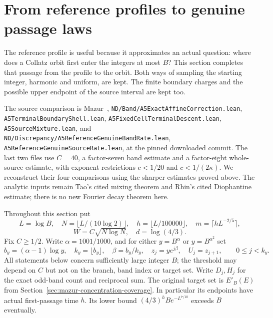 \documentclass[11pt]{article}
\theoremstyle{remark}\newtheorem{remark}[proposition]{Remark}
\begin{document}
\section{From reference profiles to genuine passage laws}
\label{sec:mazur-genuine-assembly}

The reference profile is useful because it approximates an actual question:
where does a Collatz orbit first enter the integers at most $B$? This section
completes that passage from the profile to the orbit. Both ways of sampling
the starting integer, harmonic and uniform, are kept. The finite boundary
charges and the possible upper endpoint of the source interval are kept too.

The source comparison is Mazur~\cite{Mazur2026v2},
\texttt{ND/Band/A5ExactAffineCorrection.lean},
\texttt{A5TerminalBoundaryShell.lean},
\texttt{A5FixedCellTerminalDescent.lean},
\texttt{A5SourceMixture.lean}, and
\texttt{ND/Discrepancy/A5ReferenceGenuineBandRate.lean},
\texttt{A5ReferenceGenuineSourceRate.lean}, at the pinned downloaded commit.
The last two files use $C=40$, a factor-seven band estimate and a factor-eight
whole-source estimate, with exponent restrictions $c<1/20$ and
$c<1/(2\kappa)$. We reconstruct their four comparisons using the sharper
estimates proved above. The analytic inputs remain Tao's cited mixing
theorem and Rhin's cited Diophantine estimate; there is no new Fourier
decay theorem here.

Throughout this section put
\[
 L=\log B,\quad N=\lfloor L/(10\log2)\rfloor,\quad
 h=\lfloor L/100000\rfloor,\quad m=\lceil hL^{-2/5}\rceil,
\]
\[
 W=C\sqrt{N\log N},\quad d=\log(4/3).
\]
Fix $C\ge1/2$. Write $\alpha=1001/1000$, and for either
$y=B^\alpha$ or $y=B^{\alpha^2}$ set
\[
 b_y=(\alpha-1)\log y,\quad k_y=\lfloor b_y\rfloor,\quad
 \beta=b_y/k_y,\quad z_j=ye^{j\beta},\quad U_j=z_{j+1},
 \qquad 0\le j<k_y.
\]
All statements below concern sufficiently large integer $B$; the threshold
may depend on $C$ but not on the branch, band index or target set.
Write $D_j,H_j$ for the exact odd-band count and reciprocal sum.
The original target set is $E'_B(E)$ from
Section~\ref{sec:mazur-concentration-coverage}. In particular its endpoints
have actual first-passage time $h$. Its lower bound
$(4/3)^hBe^{-L^{7/10}}$ exceeds $B$ eventually.
\end{document}
